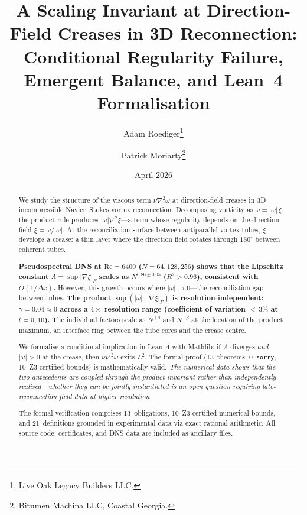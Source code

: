 \documentclass[11pt,a4paper]{article}
\title{A Scaling Invariant at Direction-Field Creases in 3D \NS{}
  Reconnection:\\ Conditional Regularity Failure, Emergent Balance,
  and Lean~4 Formalisation}
\author{Adam Roediger\thanks{Live Oak Legacy Builders LLC.}
  \and Patrick Moriarty\thanks{Bitumen Machina LLC, Coastal Georgia.}}
\date{April 2026}
\theoremstyle{definition}
\newcommand{\NS}{Navier--Stokes}
\newcommand{\grad}{\nabla}
\newcommand{\lapl}{\nabla^2}
\newcommand{\abs}[1]{\lvert #1 \rvert}
\newcommand{\Rey}{\mathrm{Re}}
\newcommand{\strongclaim}[1]{\textbf{#1}}  %
\newcommand{\weakclaim}[1]{\emph{#1}}      %
\begin{document}
\maketitle

\begin{abstract}
We study the structure of the viscous term $\nu\lapl\omega$ at
direction-field creases in 3D incompressible \NS{} vortex
reconnection.  Decomposing vorticity as $\omega=\abs{\omega}\,\xi$,
the product rule produces $\abs{\omega}\lapl\xi$---a term whose
regularity depends on the direction field $\xi=\omega/\abs{\omega}$.
At the reconciliation surface between antiparallel vortex tubes, $\xi$
develops a crease: a thin layer where the direction field rotates
through $180^\circ$ between coherent tubes.

\strongclaim{Pseudospectral DNS at $\Rey=6400$ ($N=64,128,256$) shows
that the Lipschitz constant $\Lambda=\sup\abs{\grad\xi}_F$ scales as
$N^{0.86\pm0.05}$ ($R^2>0.96$), consistent with $O(1/\Delta x)$.}
However, this growth occurs where $\abs{\omega}\to0$---the
reconciliation gap between tubes.
\strongclaim{The product $\sup(\abs{\omega}\cdot\abs{\grad\xi}_F)$
is resolution-independent: $\gamma=0.04\approx0$ across a $4\times$
resolution range (coefficient of variation ${<}\,3\%$ at $t=0,10$).}
The individual factors scale as $N^{+\beta}$ and $N^{-\beta}$ at the
location of the product maximum, an interface ring between the tube
cores and the crease centre.

We formalise a conditional implication in Lean~4 with Mathlib: if
$\Lambda$ diverges \emph{and} $\abs{\omega}>0$ at the crease, then
$\nu\lapl\omega$ exits $L^2$.  The formal proof (13~theorems,
0~\texttt{sorry}, 10~Z3-certified bounds) is mathematically valid.
\weakclaim{The numerical data shows that the two antecedents are
coupled through the product invariant rather than independently
realised---whether they can be jointly instantiated is an open
question requiring late-reconnection field data at higher
resolution.}%

The formal verification comprises 13~obligations,
10~Z3-certified numerical bounds, and 21~definitions grounded in
experimental data via exact rational arithmetic.  All source code,
certificates, and DNS data are included as ancillary files.
\end{abstract}
\end{document}
